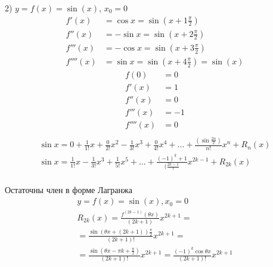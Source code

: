 2) $y = f(x) = \sin(x)$, $x_0 = 0$
\begin{align*}
  f'(x) &= \cos x = \sin\left(x + 1 \frac{\pi}{2}\right) \\
  f''(x) &= -\sin x = \sin\left(x + 2 \frac{\pi}{2}\right) \\
  f'''(x) &= - \cos x = \sin\left(x + 3 \frac{\pi}{2}\right) \\
  f''''(x) &= \sin x = \sin\left(x + 4 \frac{\pi}{2}\right) = \sin\left( x \right)
\end{align*}
\begin{align*}
  f(0) &= 0 \\
  f'(x) &= 1 \\
  f''(x) &= 0 \\
  f'''(x) &= -1 \\
  f''''(x) &= 0 \\
\end{align*}
\begin{gather*}
  \sin x = 0 + \frac{1}{1!}x + \frac{0}{2!}x^2 - \frac{1}{3!}x^3 + \frac{0}{4!}x^4 + \ldots + \frac{\left( \sin \frac{2n}{2} \right) }{n!}x^n + R_n(x) \\
  \sin x = \frac{1}{1!}x - \frac{1}{3!}x^3 + \frac{1}{5!}x^5 + \ldots + \frac{\left( -1 \right)^k+1 }{(\frac{2k-1}!}x^{2k-1} + R_{2k}(x) \\
\end{gather*}

Остаточны член в форме Лагранжа
\begin{gather*}
  y = f(x) = \sin(x), x_0 = 0 \\
  R_{2k}(x) = \frac{f^{\left( 2k-1 \right)}(\theta x)}{(2k + 1)}x^{2k+1} = \\
    = \frac{\sin(\theta x + (2k + 1)) \frac{\pi}{2}}{(2k+1)!}x^{2k+1} = \\
    = \frac{\sin(\theta x - \pi k + \frac{\pi}{2}) }{(2k + 1)!} x^{2k+1} = \frac{(-1)^k \cos \theta x}{\left( 2k + 1 \right)! } x^{2k + 1}
\end{gather*}

